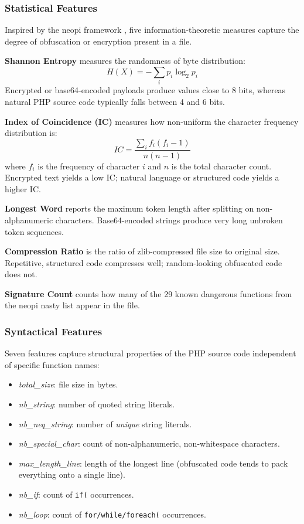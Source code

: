 \documentclass[journal,twocolumn]{IEEEtran}
\begin{document}
\subsubsection{Statistical Features}

Inspired by the neopi framework \cite{neopi2010}, five information-theoretic measures capture the degree of obfuscation or encryption present in a file.

\textbf{Shannon Entropy} measures the randomness of byte distribution:
\begin{equation}
  H(X) = -\sum_{i} p_i \log_2 p_i
  \label{eq:entropy}
\end{equation}
Encrypted or base64-encoded payloads produce values close to 8 bits, whereas natural PHP source code typically falls between 4 and 6 bits.

\textbf{Index of Coincidence (IC)} measures how non-uniform the character frequency distribution is:
\begin{equation}
  IC = \frac{\sum_i f_i(f_i - 1)}{n(n-1)}
  \label{eq:ic}
\end{equation}
where $f_i$ is the frequency of character $i$ and $n$ is the total character count. Encrypted text yields a low IC; natural language or structured code yields a higher IC.

\textbf{Longest Word} reports the maximum token length after splitting on non-alphanumeric characters. Base64-encoded strings produce very long unbroken token sequences.

\textbf{Compression Ratio} is the ratio of zlib-compressed file size to original size. Repetitive, structured code compresses well; random-looking obfuscated code does not.

\textbf{Signature Count} counts how many of the 29 known dangerous functions from the neopi nasty list appear in the file.

\subsubsection{Syntactical Features}

Seven features capture structural properties of the PHP source code independent of specific function names:

\begin{itemize}
  \item \textit{total\_size}: file size in bytes.
  \item \textit{nb\_string}: number of quoted string literals.
  \item \textit{nb\_neq\_string}: number of \textit{unique} string literals.
  \item \textit{nb\_special\_char}: count of non-alphanumeric, non-whitespace characters.
  \item \textit{max\_length\_line}: length of the longest line (obfuscated code tends to pack everything onto a single line).
  \item \textit{nb\_if}: count of \texttt{if(} occurrences.
  \item \textit{nb\_loop}: count of \texttt{for/while/foreach(} occurrences.
\end{itemize}
\end{document}
